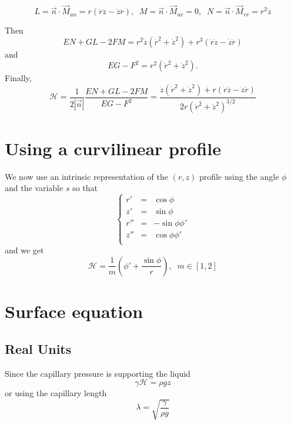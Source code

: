 \documentclass[aps,onecolumn]{revtex4}
\begin{document}
\begin{equation}
	L = \vec{n}\cdot\vec{M}_{uu} = r\left(\dot{r}\ddot{z}-\dot{z}\ddot{r}\right),\;\;
	M = \vec{n}\cdot\vec{M}_{uv} = 0,
	\;\;
	N = \vec{n}\cdot\vec{M}_{vv} = r^2\dot{z}
\end{equation}

Then
\begin{equation}
	EN + GL - 2FM = r^2 \dot{z} \left(\dot{r}^2 + \dot{z}^2\right) + r^3\left(\dot{r}\ddot{z}-\dot{z}\ddot{r}\right)
\end{equation}
and
\begin{equation}
	EG - F^2 = r^2 \left(\dot{r}^2 + \dot{z}^2\right).
\end{equation}
Finally, 
\begin{equation}
	\mathcal{H} = \dfrac{1}{2\left\vert\vec{n}\right\vert} \dfrac{EN + GL - 2FM}{EG - F^2} =
	\dfrac{\dot{z} \left(\dot{r}^2 + \dot{z}^2\right) + r\left(\dot{r}\ddot{z}-\dot{z}\ddot{r}\right)}
	{2r\left(\dot{r}^2 + \dot{z}^2\right)^{3/2}}
\end{equation}

\section{Using a curvilinear profile}
We now use an intrinsic representation of the $(r,z)$ profile using the
angle $\phi$ and the variable $s$ so that
\begin{equation}
\left\lbrace
	\begin{array}{rcl}
	r' & = & \cos \phi\\
	z' & = & \sin \phi\\
	r'' & = & -\sin\phi \phi'\\
	z'' & = & \cos\phi  \phi'\\
	\end{array}
\right.
\end{equation}
and we get
\begin{equation}
	\mathcal{H} = \frac{1}{m} \left(\phi'+\dfrac{\sin\phi}{r}\right), \;\;m\in[1,2]
\end{equation}

\section{Surface equation}
\subsection{Real Units}
Since the capillary pressure is supporting the liquid
\begin{equation}
	\gamma \mathcal{H} = \rho g z
\end{equation}
or using the capillary length
\begin{equation}
	\lambda = \sqrt{\dfrac{\gamma}{\rho g}}
\end{equation}
\end{document}
